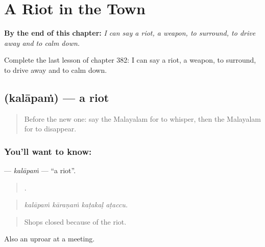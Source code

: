 
\chapter{A Riot in the Town}
\label{ch:ml-a-riot-in-the-town}

\begin{chapteropening}
\textbf{By the end of this chapter:} \emph{I can say a riot, a weapon, to surround, to drive away and to calm down.}

Complete the last lesson of chapter 382: I can say a riot, a weapon, to surround, to drive away and to calm down.
\end{chapteropening}

\section[\texorpdfstring{\ml{കലാപം} (kalāpaṁ)}{കലാപം (kalāpaṁ)}]{ (kalāpaṁ) — a riot}

\label{lesson:ML-C382-kalapam}



\begin{quote}
Before the new one: say the Malayalam for to whisper, then the Malayalam for to disappear.
\end{quote}

\subsection*{You'll want to know: }
\textbf{} — \emph{kalāpaṁ} — \textquotedblleft{}a riot\textquotedblright{}.

\begin{quote}
   .
\end{quote}

\begin{quote}
\emph{kalāpaṁ kāraṇaṁ kaṭakaḷ aṭaccu.}
\end{quote}

\begin{quote}
Shops closed because of the riot.
\end{quote}

Also an uproar at a meeting.

